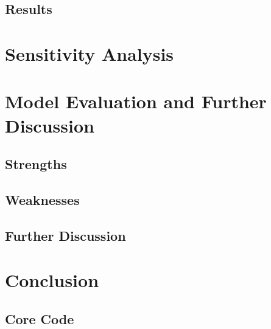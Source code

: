 \documentclass{mcmthesis}
\begin{document}
\subsection{Results}

\section{Sensitivity Analysis}

\section{Model Evaluation and Further Discussion}
\subsection{Strengths}
\subsection{Weaknesses}
\subsection{Further Discussion}

\section{Conclusion}





\begin{appendices}
\section{Core Code}
% 
\end{appendices}
\end{document}
